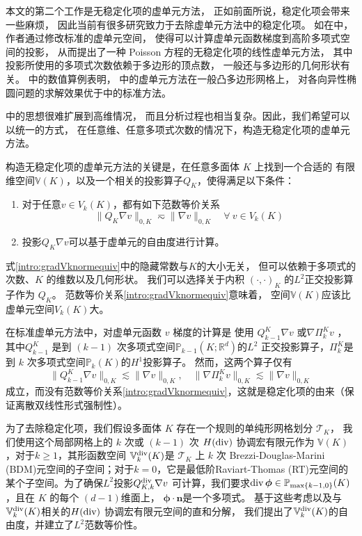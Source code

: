 本文的第二个工作是无稳定化项的虚单元方法，
正如前面所说，稳定化项会带来一些麻烦，
因此当前有很多研究致力于去除虚单元方法中的稳定化项。
如在\cite{BerroneBorioMarcon2021}中，作者通过修改标准的虚单元空间，
使得可以计算虚单元函数梯度到高阶多项式空间的投影，
从而提出了一种 Poisson 方程的无稳定化项的线性虚单元方法，
其中投影所使用的多项式次数依赖于多边形的顶点数，
一般还与多边形的几何形状有关。 
\cite{BerroneBorioMarcon2022}中的数值算例表明，
\cite{BerroneBorioMarcon2021}中的虚单元方法在一般凸多边形网格上，
对各向异性椭圆问题的求解效果优于\cite{BeiraodaVeigaBrezziMariniRusso2016}中的标准方法。

\cite{BerroneBorioMarcon2021}中的思想很难扩展到高维情况，
而且分析过程也相当复杂。因此，我们希望可以以统一的方式，
在任意维、任意多项式次数的情况下，构造无稳定化项的虚单元方法。

构造无稳定化项的虚单元方法的关键是，在任意多面体 $K$ 上找到一个合适的
有限维空间$\mathbb{V}(K)$，以及一个相关的投影算子$Q_K$，使得满足以下条件：
\begin{enumerate}[(C1)]
\item 对于任意$v\in V_k(K)$，都有如下范数等价关系
\begin{equation}\label{intro:gradVknormequiv} 
\|Q_{K}\nabla v\|_{0,K}\eqsim \|\nabla v\|_{0,K} \quad \forall~v\in V_k(K)
\end{equation}
\item 投影$Q_{K}\nabla v$可以基于虚单元的自由度进行计算。
\end{enumerate}
式\eqref{intro:gradVknormequiv}中的隐藏常数与$K$的大小无关，
但可以依赖于多项式的次数、$K$ 的维数以及几何形状。
我们可以选择关于内积 $(\cdot, \cdot)_K$ 的$L^2$正交投影算子作为 $Q_{K}$。
范数等价关系\eqref{intro:gradVknormequiv}意味着，
空间$\mathbb{V}(K)$应该比虚单元空间$V_k(K)$大。

在标准虚单元方法中，对虚单元函数 $v$ 梯度的计算是
使用 $Q_{k-1}^{K}\nabla v$ \cite{BeiraodaVeigaBrezziMariniRusso2016}
或$\nabla\Pi_k^{K}v$ 
\cite{BeiraoBrezziCangianiManziniEtAl2013,BeiraoBrezziMariniRusso2014,AhmadAlsaediBrezziMariniEtAl2013,AyusodeDiosLipnikovManzini2016}，
其中$Q_{k-1}^{K}$ 是到 $(k-1)$ 次多项式空间$\mathbb P_{k-1}(K; \mathbb{R}^d)$的$L^2$
正交投影算子，$\Pi_k^{K}$是到 $k$ 次多项式空间$\mathbb P_{k}(K)$的$H^1$投影算子。
然而，这两个算子仅有
\[
\|Q_{k-1}^{K}\nabla v\|_{0,K}\lesssim \|\nabla v\|_{0,K}, \quad \|\nabla\Pi_k^{K}v\|_{0,K}\lesssim \|\nabla v\|_{0,K}
\]
成立，而没有范数等价关系\eqref{intro:gradVknormequiv}，这就是稳定化项的由来（保证离散双线性形式强制性）。

为了去除稳定化项，我们假设多面体 $K$ 存在一个规则的单纯形网格划分
$\mathcal{T}_K$，
我们使用这个局部网格上的 $k$ 次或 $(k-1)$ 次 $ H(\operatorname{div})$ 协调宏有限元作为
$\mathbb{V}(K)$，对于$k \geq 1$，其形函数空间 $\mathbb{V}_{k}^{\rm
div}(K)$是 $\mathcal T_K$ 上 $k$ 次 Brezzi-Douglas-Marini
(BDM)元空间的子空间；对于$k=0$，它是最低阶Raviart-Thomas
(RT)元空间的某个子空间。为了确保$L^2$投影$Q_{K,k}^{\operatorname{div}}\nabla
v$ 可计算，我们要求$\operatorname{div}\boldsymbol{\phi}\in\mathbb
P_{\max\{k-1,0\}}(K)$，且在 $K$ 的每个 $(d-1)$维面上，
$\boldsymbol{\phi}\cdot\boldsymbol{n}$是一个多项式。
基于这些考虑以及与$\mathbb{V}_{k}^{\rm
div}(K)$相关的$H(\operatorname{div})$ 协调宏有限元空间的直和分解，
我们提出了$\mathbb{V}_{k}^{\rm div}(K)$的自由度，并建立了$L^2$范数等价性。

